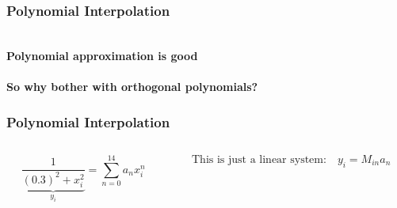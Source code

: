 \begin{frame}
  \frametitle{Polynomial Interpolation\\
    }
  \centering
  \\
  \textbf{\large Polynomial approximation is good}\\
  \pause
  \vskip 0.5in
  \\
  \textbf{\large So why bother with orthogonal polynomials?}
\end{frame}

\begin{frame}
  \frametitle{Polynomial Interpolation\\
    }
  \begin{columns}
    \begin{column}{0.35\textwidth}
      \begin{equation*}
        \underbrace{\frac{1}{(0.3)^2+x_i^2}}_{y_i} = \sum_{n=0}^{14} a_n x_i^n 
      \end{equation*}
    \end{column}
    \begin{column}{0.65\textwidth}
      \begin{equation*}
        \text{This is just a linear system:} \quad y_i = M_{in} a_n  
      \end{equation*}
    \end{column}
  \end{columns}
\end{frame}

